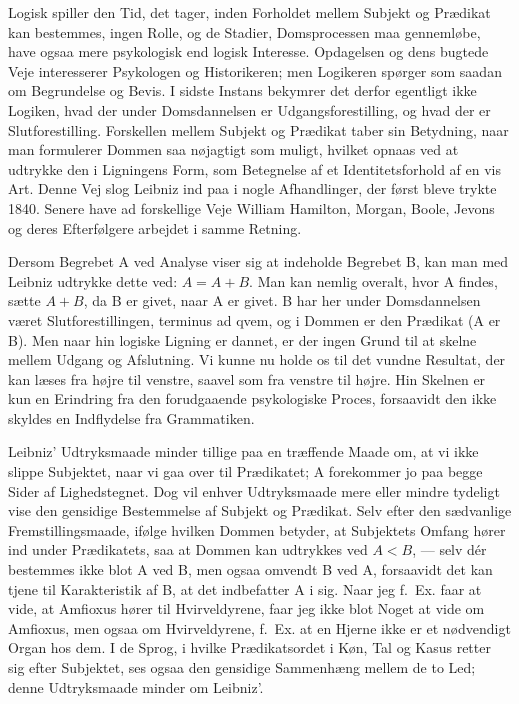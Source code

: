 \documentclass[12pt,a4paper]{book}
\newcommand{\apage}[1]{\marginnote{\footnotesize\textit{[#1]}}}
\begin{document}
Logisk spiller den Tid, det tager, inden Forholdet mellem Subjekt og
Prædikat kan bestemmes, ingen Rolle, og de Stadier, Domsprocessen maa
gennemløbe, have ogsaa mere psykologisk end logisk Interesse. Opdagelsen
og dens bugtede Veje interesserer Psykologen og Historikeren; men
Logikeren spørger som saadan om Begrundelse og Bevis. I sidste Instans
bekymrer det derfor egentligt ikke Logiken, hvad der under Domsdannelsen
er Udgangsforestilling, og hvad der er Slutforestilling. Forskellen
mellem Subjekt og \apage{94} Prædikat taber sin Betydning, naar man formulerer
Dommen saa nøjagtigt som muligt, hvilket opnaas ved at udtrykke den i
Ligningens Form, som Betegnelse af et Identitetsforhold af en vis Art.
Denne Vej slog Leibniz ind paa i nogle Afhandlinger, der først bleve
trykte 1840. Senere have ad forskellige Veje William Hamilton, Morgan,
Boole, Jevons og deres Efterfølgere arbejdet i samme Retning.

Dersom Begrebet A ved Analyse viser sig at indeholde Begrebet B, kan man
med Leibniz udtrykke dette ved: $A = A + B$. Man kan nemlig overalt,
hvor A findes, sætte $A + B$, da B er givet, naar A er givet. B har her
under Domsdannelsen været Slutforestillingen, terminus ad qvem, og i
Dommen er den Prædikat (A er B). Men naar hin logiske Ligning er dannet,
er der ingen Grund til at skelne mellem Udgang og Afslutning. Vi kunne
nu holde os til det vundne Resultat, der kan læses fra højre til
venstre, saavel som fra venstre til højre. Hin Skelnen er kun en
Erindring fra den forudgaaende psykologiske Proces, forsaavidt den ikke
skyldes en Indflydelse fra Grammatiken.

Leibniz' Udtryksmaade minder tillige paa en træffende Maade om, at vi
ikke slippe Subjektet, naar vi gaa over til Prædikatet; A forekommer jo
paa begge Sider af Lighedstegnet. Dog vil enhver Udtryksmaade mere eller
mindre tydeligt vise den gensidige Bestemmelse af Subjekt og Prædikat.
Selv efter den sædvanlige Fremstillingsmaade, ifølge hvilken Dommen
betyder, at Subjektets Omfang hører ind under Prædikatets, saa at Dommen
kan udtrykkes ved $A < B$, --- selv dér bestemmes ikke blot A ved B, men
ogsaa omvendt B ved A, forsaavidt det kan tjene til Karakteristik af B,
at det indbefatter A i sig. Naar jeg f.\ Ex. faar at vide, at Amfioxus
hører til Hvirveldyrene, faar jeg ikke blot Noget at vide om Amfioxus,
men ogsaa om Hvirveldyrene, f.\ Ex. at en Hjerne ikke er et nødvendigt
Organ hos dem. I de Sprog, i hvilke Prædikatsordet i Køn, Tal og Kasus
retter sig efter Subjektet, ses ogsaa den gensidige Sammenhæng mellem de
to Led; denne Udtryksmaade minder om Leibniz'.
\end{document}
